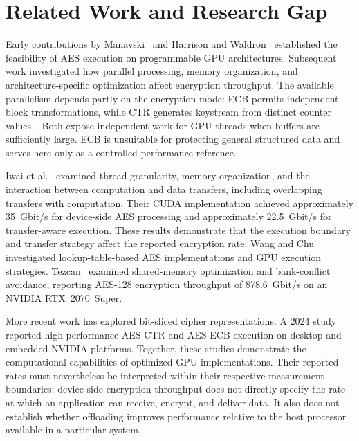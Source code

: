\section{Related Work and Research Gap}
\label{sec:related_work}

Early contributions by Manavski~\cite{manavski2007cuda} and Harrison and
Waldron~\cite{harrison2007aes} established the feasibility of AES execution on programmable GPU
architectures. Subsequent work investigated how parallel processing, memory organization, and
architecture-specific optimization affect encryption throughput. The available parallelism
depends partly on the encryption mode: ECB permits independent block transformations, while CTR
generates keystream from distinct counter values~\cite{dworkin2001modes}. Both expose
independent work for GPU threads when buffers are sufficiently large. ECB is unsuitable for
protecting general structured data and serves here only as a controlled performance reference.

Iwai et al.~\cite{iwai2012acceleration} examined thread granularity, memory organization, and
the interaction between computation and data transfers, including overlapping transfers with
computation. Their CUDA implementation achieved approximately 35~Gbit/s for device-side AES
processing and approximately 22.5~Gbit/s for transfer-aware execution. These results demonstrate
that the execution boundary and transfer strategy affect the reported encryption rate. Wang and
Chu~\cite{wang2019gpu} investigated lookup-table-based AES implementations and GPU execution
strategies. Tezcan~\cite{tezcan2021optimization} examined shared-memory optimization and
bank-conflict avoidance, reporting AES-128 encryption throughput of 878.6~Gbit/s on an NVIDIA
RTX~2070~Super.

More recent work has explored bit-sliced cipher representations. A 2024
study~\cite{bitsliced2024gpu} reported high-performance AES-CTR and AES-ECB execution on desktop
and embedded NVIDIA platforms. Together, these studies demonstrate the computational
capabilities of optimized GPU implementations. Their reported rates must nevertheless be
interpreted within their respective measurement boundaries: device-side encryption throughput
does not directly specify the rate at which an application can receive, encrypt, and deliver
data. It also does not establish whether offloading improves performance relative to the host
processor available in a particular system.

